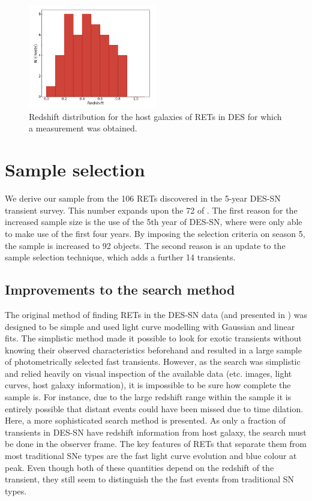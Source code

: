 \documentclass[fleqn,usenatbib,]{mnras}
\newcommand{\replylluis}[1]{\color{green}#1 \color{black}}
\begin{document}
\begin{figure}
\includegraphics[width=0.5\textwidth]{figs/z_dist.png}
\caption{Redshift distribution for the host galaxies of RETs in DES for which a measurement was obtained.
\label{fig:z_dist}}
\end{figure}

\section{Sample selection}
\label{sec:sample}
We derive our sample from the 106 RETs discovered in the 5-year DES-SN transient survey. This number expands upon the 72 of . The first reason for the increased sample size is the use of the 5th year of DES-SN, where  were only able to make use of the first four years. \replylluis{By imposing the \citetalias{Pursiainen2018} selection criteria on season 5, the sample is increased to 92 objects.} The second reason is an update to the sample selection technique, \replylluis{which adds a further 14 transients.}

\subsection{Improvements to the search method \label{subsec:new_method}}

The original method of finding RETs in the DES-SN data (and presented in ) was designed to be simple and used light curve modelling with Gaussian and linear fits. The simplistic method made it possible to look for exotic transients without knowing their observed characteristics beforehand and resulted in a large sample of photometrically selected fast transients. However, as the search was simplistic and relied heavily on visual inspection of the available data (etc. images, light curves, host galaxy information), it is impossible to be sure how complete the sample is. For instance, due to the large redshift range within the sample it is entirely possible that distant events could have been missed due to time dilation. Here, a more sophisticated search method is presented. As only a fraction of transients in DES-SN have redshift information from host galaxy, the search must be done in the observer frame.  The key features of RETs that separate them from most traditional SNe types are the fast light curve evolution and blue colour at peak. Even though both of these quantities depend on the redshift of the transient, they still seem to distinguish the the fast events from traditional SN types. 
\end{document}
